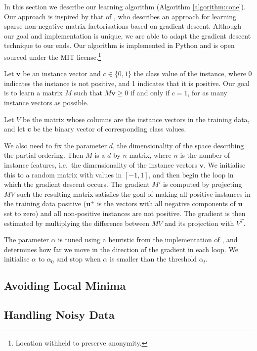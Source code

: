 In this section we describe our learning algorithm (Algorithm
\ref{algorithm:cone}). Our approach is inspired by that of
, who describes an approach for learning sparse
non-negative matrix factorisations based on gradient descent. Although
our goal and implementation is unique, we are able to adapt the
gradient descent technique to our ends. Our algorithm is implemented
in Python and is open sourced under the MIT license.\footnote{Location
  withheld to preserve anonymity.}

Let $\mathbf{v}$ be an instance vector and $c \in \{0,1\}$ the class value of
the instance, where 0 indicates the instance is not positive, and 1
indicates that it is positive. Our goal is to learn a matrix $M$ such
that $M\mathbf{v} \ge 0$ if and only if $c = 1$, for as many instance vectors
as possible.

Let $V$ be the matrix whose columns are the instance vectors in the
training data, and let $\mathbf{c}$ be the binary vector of
corresponding class values.

We also need to fix the parameter $d$, the dimensionality of the space
describing the partial ordering. Then $M$ is a $d$ by $n$ matrix,
where $n$ is the number of instance features, i.e.~the dimensionality
of the instance vectors $\mathbf{v}$. We initialise this to a random
matrix with values in $[-1,1]$, and then begin the loop in which the
gradient descent occurs. The gradient $M'$ is computed by projecting
$MV$ such the resulting matrix satisfies the goal of making all
positive instances in the training data positive ($\mathbf{u}^+$ is
the vectors with all negative components of $\mathbf{u}$ set to zero)
and all non-positive instances are not positive. The gradient is then
estimated by multiplying the difference between $MV$ and its
projection with $V^T$.

The parameter $\alpha$ is tuned using a heuristic from the
implementation of , and determines how far we move
in the direction of the gradient in each loop. We initialise $\alpha$
to $\alpha_0$ and stop when $\alpha$ is smaller than the threshold
$\alpha_t$.

\subsection{Avoiding Local Minima}

\subsection{Handling Noisy Data}
